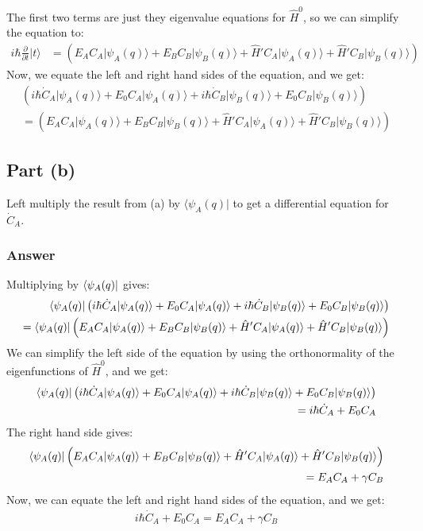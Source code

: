 \documentclass{article}
\begin{document}
The first two terms are just they eigenvalue equations for \( \hat{H}^0 \), so we can simplify the equation to:
\begin{align}
i\hbar \frac{\partial}{\partial t} \lvert t \rangle &= \left( E_A C_A \lvert \psi_A(q) \rangle + E_B C_B \lvert \psi_B(q) \rangle + \hat{H}' C_A \lvert \psi_A(q) \rangle + \hat{H}' C_B \lvert \psi_B(q) \rangle \right)
\end{align}
Now, we equate the left and right hand sides of the equation, and we get:
\begin{align}
\left( i\hbar\dot{C}_A \lvert \psi_A(q) \rangle + E_0 C_A \lvert \psi_A(q) \rangle + i\hbar\dot{C}_B \lvert \psi_B(q) \rangle + E_0 C_B \lvert \psi_B(q) \rangle \right) \\ = \left( E_A C_A \lvert \psi_A(q) \rangle + E_B C_B \lvert \psi_B(q) \rangle + \hat{H}' C_A \lvert \psi_A(q) \rangle + \hat{H}' C_B \lvert \psi_B(q) \rangle \right)
\end{align}
\subsection{Part (b)}
Left multiply the result from (a) by \( \langle \psi_A(q) \lvert \) to get a differential equation for \( \dot{C}_A \).
\subsubsection{Answer}
Multiplying by $\bra{\psi _A(q)}$ gives:
\begin{align}
\bra{\psi _A(q)} \left( i\hbar\dot{C}_A \lvert \psi_A(q) \rangle + E_0 C_A \lvert \psi_A(q) \rangle + i\hbar\dot{C}_B \lvert \psi_B(q) \rangle + E_0 C_B \lvert \psi_B(q) \rangle \right) \\ = \bra{\psi _A(q)} \left( E_A C_A \lvert \psi_A(q) \rangle + E_B C_B \lvert \psi_B(q) \rangle + \hat{H}' C_A \lvert \psi_A(q) \rangle + \hat{H}' C_B \lvert \psi_B(q) \rangle \right)
\end{align}
We can simplify the left side of the equation by using the orthonormality of the eigenfunctions of \( \hat{H}^0 \), and we get:
\begin{align}
\bra{\psi _A(q)} \left( i\hbar\dot{C}_A \lvert \psi_A(q) \rangle + E_0 C_A \lvert \psi_A(q) \rangle + i\hbar\dot{C}_B \lvert \psi_B(q) \rangle + E_0 C_B \lvert \psi_B(q) \rangle \right) \\ = i \hbar \dot{C}_A + E_0 C_A
\end{align}
The right hand side gives:
\begin{align}
\bra{\psi _A(q)} \left( E_A C_A \lvert \psi_A(q) \rangle + E_B C_B \lvert \psi_B(q) \rangle + \hat{H}' C_A \lvert \psi_A(q) \rangle + \hat{H}' C_B \lvert \psi_B(q) \rangle \right) \\ = E_A C_A + \gamma C_B
\end{align}
Now, we can equate the left and right hand sides of the equation, and we get:
\begin{align}
i \hbar \dot{C}_A + E_0 C_A = E_A C_A + \gamma C_B
\end{align}
\end{document}

